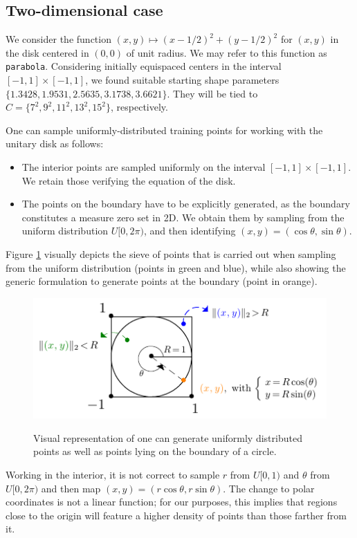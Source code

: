 \documentclass[12pt]{report} %
\begin{document}
\clearpage
\subsection*{Two-dimensional case}

We consider the function $(x,y) \mapsto (x-1/2)^2 + (y-1/2)^2$ for $(x,y)$ in the disk centered in $(0,0)$ of unit radius. We may refer to this function as \texttt{parabola}. Considering initially equispaced centers in the interval $[-1,1]\times[-1,1]$, we found suitable starting shape parameters $\{1.3428, 1.9531, 2.5635, 3.1738, 3.6621\}$. They will be tied to $C=\{7^2,9^2,11^2,13^2,15^2\}$, respectively.

One can sample uniformly-distributed training points for working with the unitary disk as follows:
\begin{itemize}
  \item The interior points are sampled uniformly on the interval $[-1,1]\times[-1,1]$. We retain those verifying the equation of the disk.
  \item The points on the boundary have to be explicitly generated, as the boundary constitutes a measure zero set in 2D. We obtain them by sampling from the uniform distribution $U[0,2\pi)$, and then identifying $(x,y)=(\cos\theta, \sin\theta)$.
\end{itemize}

Figure \ref{fig:uniform-circle} visually depicts the sieve of points that is carried out when sampling from the uniform distribution (points in green and blue), while also showing the generic formulation to generate points at the boundary (point in orange).

\begin{figure}[h]  
  {\includegraphics[width=.8\textwidth]{imagenes/experiments/helpful_images/uniform_circle.pdf}}
  \caption{Visual representation of one can generate uniformly distributed points as well as points lying on the boundary of a circle.}
  \label{fig:uniform-circle}
\end{figure}

Working in the interior, it is not correct to sample $r$ from $U[0,1)$ and $\theta$ from $U[0,2\pi)$ and then map $(x,y)=(r \cos \theta, r \sin \theta)$. The change to polar coordinates is not a linear function; for our purposes, this implies that regions close to the origin will feature a higher density of points than those farther from it.
\end{document}
